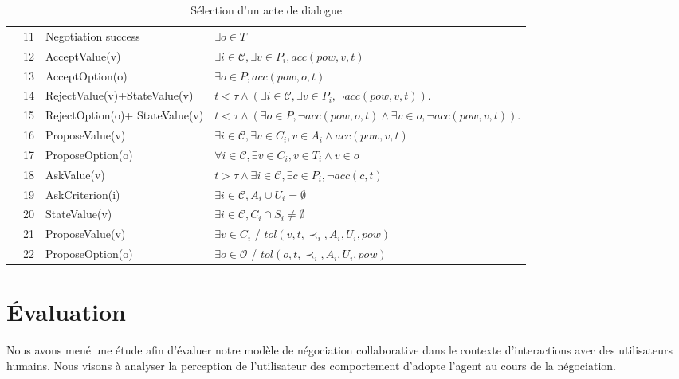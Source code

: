 \begin{table}[!t]
{\begin{tabular}{|p{.3cm}|p{.6cm}|p{3cm}|p{7.5cm}|}
						\hline
						
						\parbox[t]{2mm}{
							} & 11& Negotiation success &  $\exists o \in T$ \\
						&12& AcceptValue(v) & $\exists i\in\mathcal{C}, \exists v \in P_i, acc(pow, v, t)$ \\
						&13&AcceptOption(o) & $\exists o \in P, acc(pow, o, t)$ \\
						&14&RejectValue(v)+\newline StateValue(v) & $ t<\tau \land (\exists i\in\mathcal{C}, \exists v \in P_i, \neg acc(pow,v, t))$.\\
						&15&RejectOption(o)+ \newline StateValue(v) & $ t<\tau \land (\exists o \in P,  \neg acc(pow,o, t) \land \exists v \in o, \neg acc(pow,v, t))$.\\
						&16&ProposeValue(v) &  $\exists i\in\mathcal{C}, \exists v \in C_i, v \in A_i  \land acc(pow, v, t) $\\
						&17&ProposeOption(o)  & $\forall i\in\mathcal{C},\exists v \in C_i, v \in T_i  \land v \in o$ \\
						&18&AskValue(v) & $t > \tau \land \exists i\in\mathcal{C}, \exists c \in P_i, \neg acc(c, t)$ \\
						&19&AskCriterion(i) & $\exists i\in\mathcal{C}, A_i \cup U_i= \emptyset $\\
						&20&StateValue(v) & $\exists i\in\mathcal{C}, C_i\cap S_i \neq \emptyset$	\\
						&21& ProposeValue(v) & $\exists v \in C_i$ / $tol(v, t, \prec_i, A_i, U_i, pow)$\\
						&22& ProposeOption(o) & $\exists o \in \mathcal{O}$ / $tol(o, t, \prec_i, A_i, U_i, pow)$\\
						
						\hline
					\end{tabular}
				}
				\caption{Sélection d'un acte de dialogue}
				\label{table:uttChoice}
			\end{table}
	
		
			\section{Évaluation}
			\label{sec:eval}
			Nous avons mené une étude afin d'évaluer notre modèle de négociation collaborative dans le contexte d'interactions avec des utilisateurs humains. Nous visons à analyser la perception de l'utilisateur des comportement d'adopte l'agent au cours de la négociation.
			
